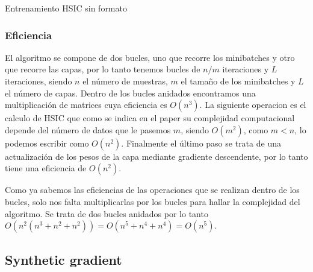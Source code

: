 \begin{algorithm}[H]
   \caption{Entrenamiento HSIC sin formato}
   
   
\end{algorithm}

\subsubsection{Eficiencia}


El algoritmo se compone de dos bucles, uno que recorre los minibatches y otro que recorre las capas, por lo tanto tenemos bucles de $n/m$ iteraciones y $L$ iteraciones, siendo $n$ el número de muestras, $m$ el tamaño de los minibatches y $L$ el número de capas. Dentro de los bucles anidados encontramos una multiplicación de matrices cuya eficiencia es $O(n^3)$. La siguiente operacion es el calculo de HSIC que como se indica en el paper su complejidad computacional depende del número de datos que le pasemos $m$, siendo $O(m^2)$, como $m < n$, lo podemos escribir como $O(n^2)$. Finalmente el último paso se trata de una actualización de los pesos de la capa mediante gradiente descendente, por lo tanto tiene una eficiencia de $O(n^2)$. 

Como ya sabemos las eficiencias de las operaciones que se realizan dentro de los bucles, solo nos falta multiplicarlas por los bucles para hallar la complejidad del algoritmo. Se trata de dos bucles anidados por lo tanto $O(n^{2}(n^{3}+n^{2}+n^{2})) = O(n^{5}+n^{4}+n^{4}) = O(n^{5})$.


\subsection{Synthetic gradient}


